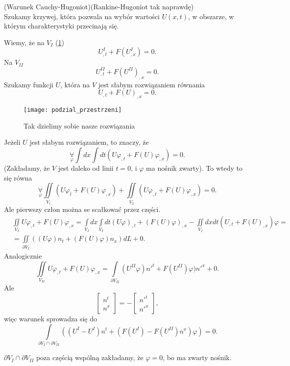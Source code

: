 \documentclass[../main.tex]{subfiles}
\begin{document}
\begin{stw}
    (Warunek Cauchy-Hugoniot)(Rankine-Hugoniot tak naprawdę)\\
    Szukamy krzywej, która pozwala na wybór wartości $U(x,t)$, w obszarze, w którym charakterystyki przecinają się.
\end{stw}
Wiemy, że na $V_I$ (\ref{fig:podzial_przestrzeni})
 \[
     U^I_{,t} + F\left( U^I_{,x} \right) = 0
.\]
Na $V_{II}$
 \[
     U^{II}_{,t} + F\left( U^{II} \right)_{,x} = 0
 .\]
 Szukamy funkcji $U$, która na $V$ jest słabym rozwiązaniem równania
 \[
     U_{,t} + F(U)_{,x} = 0
 .\]

 \begin{figure}[h]
     \centering
     \texttt{[image: podzial\_przestrzeni]}
     \caption{Tak dzielimy sobie nasze rozwiązania}
     \label{fig:podzial_przestrzeni}
 \end{figure}

 Jeżeli $U$ jest słabym rozwiązaniem, to znaczy, że
 \[
     \underset{\varphi}{\forall} \int dx\int dt \left( U \varphi_{,t} + F\left( U \right) \varphi_{,x} \right) = 0
 .\]
 (Zakładamy, że $V$ jest daleko od linii $t = 0$, i $\varphi$ ma nośnik zwarty). To wtedy to się równa
 \[
     \underset{\varphi}{\forall} \iint\limits_{V_1} \left( U \varphi_{t} + F(U)\varphi_{,x} \right) + \iint\limits_{V_2}\left( U \varphi_{,t} + F(U) \varphi_{,x} \right) = 0
 .\]
 Ale pierwszy człon można se scałkować przez części.
 \begin{align*}
     &\iint\limits_{V_I} U\varphi_{,t} + F(U)\varphi_{,x} = \int\limits_{V_I}dx\int\limits_{V_I}dt \left( U\varphi \right) _{,t} + \left( F(U)\varphi \right) _{,x} - \iint\limits_{V_I}dxdt\left( U_{,t} + F(U)_{,x} \right) \varphi = \\
     &= \iint\limits_{\partial V_I}\left( (U\varphi)n_t + (F(U)\varphi)n_x \right) dL + 0
 .\end{align*}
 Analogicznie
 \[
     \iint\limits_{V_{II}} U\varphi_{,t} + F(U)\varphi_{,x} = \int\limits_{\partial V_{II}}\left( U^{II}\varphi \right) n'^t  + F(U^{II})\varphi)n'^x  + 0
 .\]
 Ale \[
     \begin{bmatrix} n^t\\n^x \end{bmatrix} = -\begin{bmatrix} n'^t\\n'^x \end{bmatrix}
 ,\]
 więc warunek sprowadza się do
 \[
     \int\limits_{\partial V_I \cap \partial V_{II}} \left( (U^I - U^I)n^t + \left( F(U^I) - F(U^{II})n^x \right) \varphi \right) = 0
 .\]

 $\partial V_I \cap \partial V_{II}$ poza częścią wspólną zakładamy, że $\varphi = 0$, bo ma zwarty nośnik.
\end{document}
